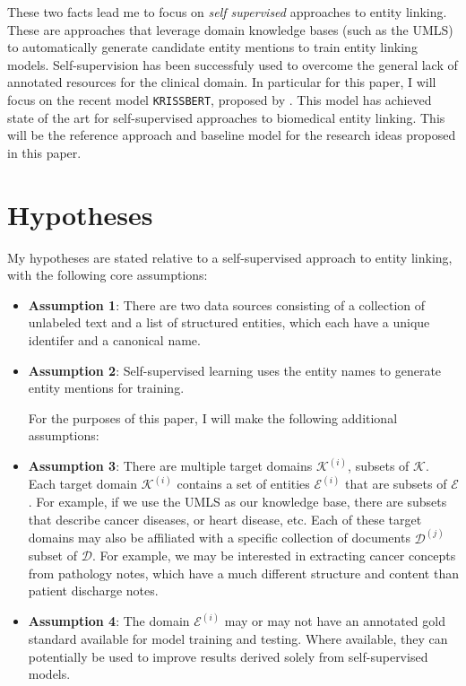 \documentclass{article}
\begin{document}
These two facts lead me to focus on \emph{self supervised} \cite{krishnan_self-supervised_2022} approaches to entity linking. These are approaches that leverage domain knowledge bases (such as the UMLS) to automatically generate candidate entity mentions to train entity linking models. Self-supervision has been successfuly used to overcome the general lack of annotated resources for the clinical domain. In particular for this paper, I will focus on the recent model \texttt{KRISSBERT}, proposed by \cite{zhang_knowledge-rich_2022}. This model has achieved state of the art for self-supervised approaches to biomedical entity linking. This will be the reference approach and baseline model for the research ideas proposed in this paper.


\section{Hypotheses}

My hypotheses are stated relative to a self-supervised approach to entity linking, with the following core assumptions:

\begin{itemize}
  \item \textbf{Assumption 1}: There are two data sources consisting of a collection of unlabeled text and a list of structured entities, which each have a unique identifer and a canonical name.
  \item \textbf{Assumption 2}: Self-supervised learning uses the entity names to generate entity mentions for training.

  \vspace{1em}
  For the purposes of this paper, I will make the following additional assumptions:

  \item  \textbf{Assumption 3}: There are multiple target domains $\mathscr{K}^{(i)}$, subsets of $\mathscr{K}$. Each target domain $\mathscr{K}^{(i)}$ contains a set of entities $\mathscr{E}^{(i)}$ that are subsets of $\mathscr{E}$. For example, if we use the UMLS as our knowledge base, there are subsets that describe cancer diseases, or heart disease, etc. Each of these target domains may also be affiliated with a specific collection of documents $\mathscr{D}^{(j)}$ subset of $\mathscr{D}$. For example, we may be interested in extracting cancer concepts from pathology notes, which have a much different structure and content than patient discharge notes.

  \item \textbf{Assumption 4}: The domain $\mathscr{E}^{(i)}$ may or may not have an annotated gold standard available for model training and testing. Where available, they can potentially be used to improve results derived solely from self-supervised models.
\end{itemize}
\end{document}
